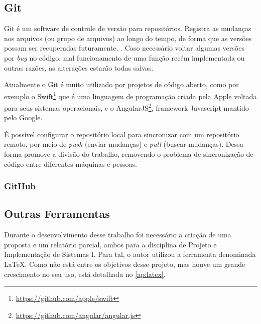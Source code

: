 \subsection{Git}\label{sec:git}

Git é um software de controle de versão para repositórios. Registra as mudanças nos arquivos (ou grupo de arquivos) ao longo do tempo, de forma que as versões possam ser recuperadas futuramente. \cite{pro-git}. Caso necessário voltar algumas versões por \textit{bug} no código, mal funcionamento de uma função recém implementada ou outras razões, as alterações estarão todas salvas.

Atualmente o Git é muito utilizado por projetos de código aberto, como por exemplo o Swift\footnote{\url{https://github.com/apple/swift}} que é uma linguagem de programação criada pela Apple voltada para seus sistemas operacionais, e o AngularJS\footnote{\url{https://github.com/angular/angular.js}}, framework Javascript mantido pelo Google.

É possível configurar o repositório local para sincronizar com um repositório remoto, por meio de \textit{push} (enviar mudanças) e \textit{pull} (buscar mudanças). Dessa forma promove a divisão do trabalho, removendo o problema de sincronização de código entre diferentes máquinas e pessoas.

\subsubsection{GitHub}\label{sec:github}



\subsection{Outras Ferramentas}\label{sec:outras-ferramentas}

Durante o desenvolvimento desse trabalho foi necessário a criação de uma proposta e um relatório parcial, ambos para a disciplina de Projeto e Implementação de Sistemas I. Para tal, o autor utilizou a ferramenta denominada LaTeX. Como não está entre os objetivos desse projeto, mas houve um grande crescimento no seu uso, está detalhada no \autoref{ap:latex}.


